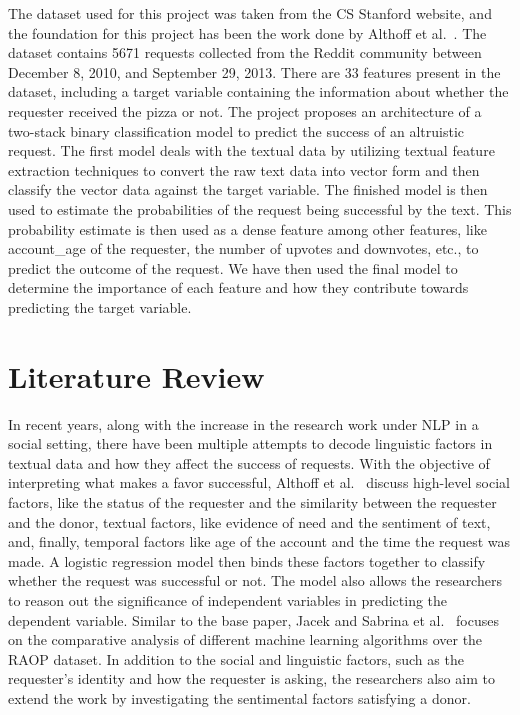 \documentclass[runningheads]{llncs}
\begin{document}
The dataset used for this project was taken from the CS Stanford website, and the foundation for this project has been the work done by Althoff et al.~\cite{raop_base}. The dataset contains 5671 requests collected from the Reddit community between December 8, 2010, and September 29, 2013. There are 33 features present in the dataset, including a target variable containing the information about whether the requester received the pizza or not. The project proposes an architecture of a two-stack binary classification model to predict the success of an altruistic request. The first model deals with the textual data by utilizing textual feature extraction techniques to convert the raw text data into vector form and then classify the vector data against the target variable. The finished model is then used to estimate the probabilities of the request being successful by the text. This probability estimate is then used as a dense feature among other features, like account\_age of the requester, the number of upvotes and downvotes, etc., to predict the outcome of the request. We have then used the final model to determine the importance of each feature and how they contribute towards predicting the target variable.

\section{Literature Review}
In recent years, along with the increase in the research work under NLP in a social setting, there have been multiple attempts to decode linguistic factors in textual data and how they affect the success of requests. With the objective of interpreting what makes a favor successful, Althoff et al.~\cite{raop_base} discuss high-level social factors, like the status of the requester and the similarity between the requester and the donor, textual factors, like evidence of need and the sentiment of text, and, finally, temporal factors like age of the account and the time the request was made. A logistic regression model then binds these factors together to classify whether the request was successful or not. The model also allows the researchers to reason out the significance of independent variables in predicting the dependent variable. Similar to the base paper, Jacek and Sabrina et al.~\cite{raop_sent} focuses on the comparative analysis of different machine learning algorithms over the RAOP dataset. In addition to the social and linguistic factors, such as the requester's identity and how the requester is asking, the researchers also aim to extend the work by investigating the sentimental factors satisfying a donor.
\end{document}
